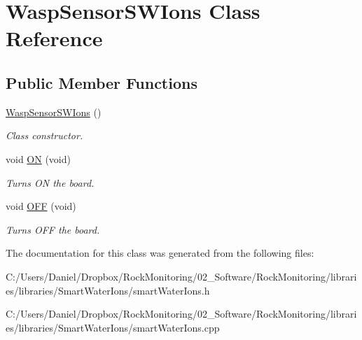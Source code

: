 \hypertarget{class_wasp_sensor_s_w_ions}{}\section{Wasp\+Sensor\+S\+W\+Ions Class Reference}
\label{class_wasp_sensor_s_w_ions}
\subsection*{Public Member Functions}
\begin{DoxyCompactItemize}
\item 
\hyperlink{class_wasp_sensor_s_w_ions_af6e9b56b93f61b05a8f5dacedf035d35}{Wasp\+Sensor\+S\+W\+Ions} ()\hypertarget{class_wasp_sensor_s_w_ions_af6e9b56b93f61b05a8f5dacedf035d35}{}\label{class_wasp_sensor_s_w_ions_af6e9b56b93f61b05a8f5dacedf035d35}

\begin{DoxyCompactList}\small\item\em Class constructor. \end{DoxyCompactList}\item 
void \hyperlink{class_wasp_sensor_s_w_ions_a68cb404bbabaefde0446ef0dd3a48db6}{ON} (void)\hypertarget{class_wasp_sensor_s_w_ions_a68cb404bbabaefde0446ef0dd3a48db6}{}\label{class_wasp_sensor_s_w_ions_a68cb404bbabaefde0446ef0dd3a48db6}

\begin{DoxyCompactList}\small\item\em Turns ON the board. \end{DoxyCompactList}\item 
void \hyperlink{class_wasp_sensor_s_w_ions_ac576280e392c95712dc0e5d33a0a7bc5}{O\+FF} (void)\hypertarget{class_wasp_sensor_s_w_ions_ac576280e392c95712dc0e5d33a0a7bc5}{}\label{class_wasp_sensor_s_w_ions_ac576280e392c95712dc0e5d33a0a7bc5}

\begin{DoxyCompactList}\small\item\em Turns O\+FF the board. \end{DoxyCompactList}\end{DoxyCompactItemize}


The documentation for this class was generated from the following files\+:\begin{DoxyCompactItemize}
\item 
C\+:/\+Users/\+Daniel/\+Dropbox/\+Rock\+Monitoring/02\+\_\+\+Software/\+Rock\+Monitoring/libraries/libraries/\+Smart\+Water\+Ions/smart\+Water\+Ions.\+h\item 
C\+:/\+Users/\+Daniel/\+Dropbox/\+Rock\+Monitoring/02\+\_\+\+Software/\+Rock\+Monitoring/libraries/libraries/\+Smart\+Water\+Ions/smart\+Water\+Ions.\+cpp\end{DoxyCompactItemize}
